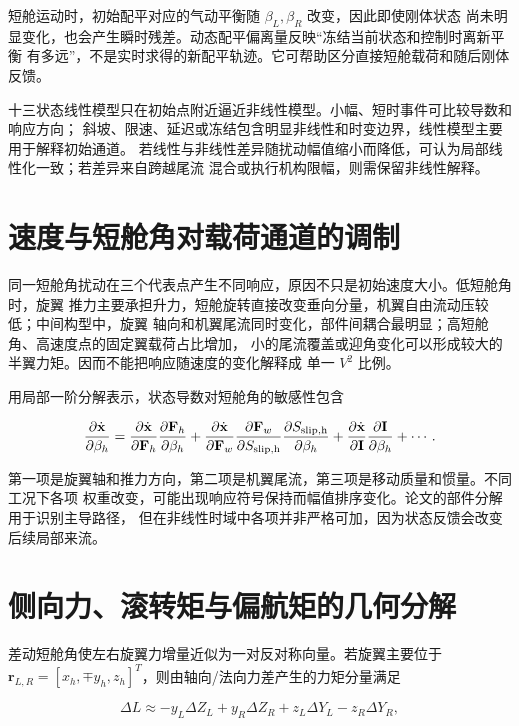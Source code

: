 \documentclass[UTF8,12pt,oneside,openany,fontset=windows]{ctexbook}
\begin{document}
短舱运动时，初始配平对应的气动平衡随 \(\beta_L,\beta_R\) 改变，因此即使刚体状态 尚未明显变化，也会产生瞬时残差。动态配平偏离量反映“冻结当前状态和控制时离新平衡 有多远”，不是实时求得的新配平轨迹。它可帮助区分直接短舱载荷和随后刚体反馈。

十三状态线性模型只在初始点附近逼近非线性模型。小幅、短时事件可比较导数和响应方向； 斜坡、限速、延迟或冻结包含明显非线性和时变边界，线性模型主要用于解释初始通道。 若线性与非线性差异随扰动幅值缩小而降低，可认为局部线性化一致；若差异来自跨越尾流 混合或执行机构限幅，则需保留非线性解释。

\section{速度与短舱角对载荷通道的调制}

同一短舱角扰动在三个代表点产生不同响应，原因不只是初始速度大小。低短舱角时，旋翼 推力主要承担升力，短舱旋转直接改变垂向分量，机翼自由流动压较低；中间构型中，旋翼 轴向和机翼尾流同时变化，部件间耦合最明显；高短舱角、高速度点的固定翼载荷占比增加， 小的尾流覆盖或迎角变化可以形成较大的半翼力矩。因而不能把响应随速度的变化解释成 单一 \(V^2\) 比例。

用局部一阶分解表示，状态导数对短舱角的敏感性包含

\begin{equation}
\frac{\partial\dot{\mathbf x}}{\partial\beta_h}
=\frac{\partial\dot{\mathbf x}}{\partial\mathbf F_h}
\frac{\partial\mathbf F_h}{\partial\beta_h}
+\frac{\partial\dot{\mathbf x}}{\partial\mathbf F_w}
\frac{\partial\mathbf F_w}{\partial S_{\rm slip,h}}
\frac{\partial S_{\rm slip,h}}{\partial\beta_h}
+\frac{\partial\dot{\mathbf x}}{\partial\mathbf I}
\frac{\partial\mathbf I}{\partial\beta_h}+\cdots .
\end{equation}

第一项是旋翼轴和推力方向，第二项是机翼尾流，第三项是移动质量和惯量。不同工况下各项 权重改变，可能出现响应符号保持而幅值排序变化。论文的部件分解用于识别主导路径， 但在非线性时域中各项并非严格可加，因为状态反馈会改变后续局部来流。

\section{侧向力、滚转矩与偏航矩的几何分解}

差动短舱角使左右旋翼力增量近似为一对反对称向量。若旋翼主要位于 \(\mathbf r_{L,R}=[x_h,\mp y_h,z_h]^T\)，则由轴向/法向力差产生的力矩分量满足

\begin{equation}
\Delta L\approx-y_L\Delta Z_L+y_R\Delta Z_R
+z_L\Delta Y_L-z_R\Delta Y_R,
\end{equation}
\end{document}
